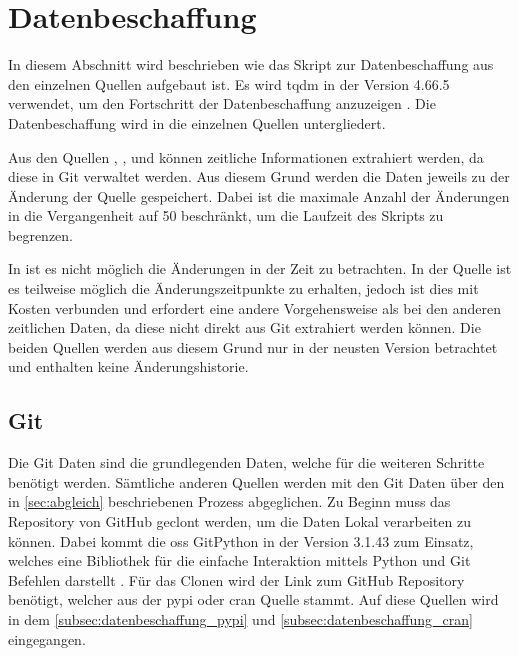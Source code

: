 \section{Datenbeschaffung}
\label{sec:datenbeschaffung}
In diesem Abschnitt wird beschrieben wie das Skript zur Datenbeschaffung aus den einzelnen Quellen aufgebaut ist.
Es wird tqdm in der Version 4.66.5 verwendet, um den Fortschritt der Datenbeschaffung anzuzeigen \autocite{costa-luis_tqdm_2024}.
Die Datenbeschaffung wird in die einzelnen Quellen untergliedert.

Aus den Quellen , ,  und  können zeitliche Informationen extrahiert werden, da diese in Git verwaltet werden.
Aus diesem Grund werden die Daten jeweils zu der Änderung der Quelle gespeichert.
Dabei ist die maximale Anzahl der Änderungen in die Vergangenheit auf 50 beschränkt, um die Laufzeit des Skripts zu begrenzen.

In  ist es nicht möglich die Änderungen in der Zeit zu betrachten.
In der  Quelle ist es teilweise möglich die Änderungszeitpunkte zu erhalten, jedoch ist dies mit Kosten verbunden und erfordert eine andere Vorgehensweise als bei den anderen zeitlichen Daten, da diese nicht direkt aus Git extrahiert werden können.
Die beiden Quellen werden aus diesem Grund nur in der neusten Version betrachtet und enthalten keine Änderungshistorie.

\subsection{Git} %
\label{subsec:datenbeschaffung_git}
Die Git Daten sind die grundlegenden Daten, welche für die weiteren Schritte benötigt werden.
Sämtliche anderen Quellen werden mit den Git Daten über den in \autoref{sec:abgleich} beschriebenen Prozess abgeglichen.
Zu Beginn muss das Repository von GitHub geclont werden, um die Daten Lokal verarbeiten zu können.
Dabei kommt die \gls{oss} GitPython in der Version 3.1.43 zum Einsatz, welches eine Bibliothek für die einfache Interaktion mittels Python und Git Befehlen darstellt \autocite{thiel_gitpython-developersgitpython_2024}.
Für das Clonen wird der Link zum GitHub Repository benötigt, welcher aus der \gls{pypi} oder \gls{cran} Quelle stammt.
Auf diese Quellen wird in dem \autoref{subsec:datenbeschaffung_pypi} und \autoref{subsec:datenbeschaffung_cran} eingegangen.

